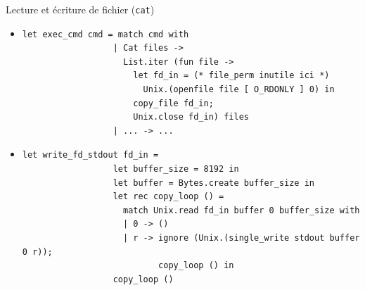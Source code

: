 \begin{frame}[fragile]{Lecture et écriture de fichier (\texttt{cat})}
    \begin{itemize}[leftmargin=-10pt]
        \item<2->
            \begin{lstlisting}[basicstyle=\footnotesize\ttfamily]
                let exec_cmd cmd = match cmd with 
                  | Cat files -> 
                    List.iter (fun file ->
                      let fd_in = (* file_perm inutile ici *)
                        Unix.(openfile file [ O_RDONLY ] 0) in
                      copy_file fd_in;
                      Unix.close fd_in) files
                  | ... -> ...   
        \end{lstlisting}
        \item<3->
            \begin{lstlisting}[basicstyle=\footnotesize\ttfamily]
                let write_fd_stdout fd_in =
                  let buffer_size = 8192 in
                  let buffer = Bytes.create buffer_size in
                  let rec copy_loop () =
                    match Unix.read fd_in buffer 0 buffer_size with
                    | 0 -> ()
                    | r -> ignore (Unix.(single_write stdout buffer 0 r));
                           copy_loop () in
                  copy_loop ()
            \end{lstlisting}
     \end{itemize}
\end{frame}